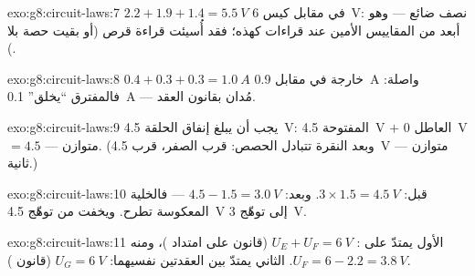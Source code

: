 \begin{solution}{exo:g8:circuit-laws:7}
$2.2 + 1.9 + 1.4 = \qty{5.5}{V}$ في مقابل كيس \qty{6}{V}: نصف
 ضائع --- وهو أبعد من  المقاييس الأمين عند قراءات
كهذه؛ فقد أُسيئت قراءة قرص (أو بقيت حصة بلا ).
\end{solution}

\begin{solution}{exo:g8:circuit-laws:8}
$0.4 + 0.3 + 0.3 = \qty{1.0}{A}$ خارجة في مقابل \qty{0.9}{A}
واصلة: فالمفترق ``يخلق'' \qty{0.1}{A} --- مُدان بقانون العقد.
\end{solution}

\begin{solution}{exo:g8:circuit-laws:9}
يجب أن يبلغ إنفاق الحلقة   \qty{4.5}{V}: 
المفتوحة \qty{4.5}{V} $+$  العاطل \qty{0}{V} $= 4.5$ ---
متوازن. (وبعد النقرة تتبادل الحصص:  قرب الصفر،
 قرب \qty{4.5}{V} --- متوازن ثانية.)
\end{solution}

\begin{solution}{exo:g8:circuit-laws:10}
قبل: $3 \times 1.5 = \qty{4.5}{V}$. وبعد: $4.5 - 1.5 =
\qty{3.0}{V}$ --- فالخلية المعكوسة تطرح. ويخفت  من
توهّج \qty{4.5}{V} إلى توهّج \qty{3}{V}.
\end{solution}

\begin{solution}{exo:g8:circuit-laws:11}
 الأول يمتدّ على : $U_E + U_F = \qty{6}{V}$
(قانون   على امتداد )، ومنه $U_F = 6 -
2.2 = \qty{3.8}{V}$.  الثاني يمتدّ بين العقدتين
نفسيهما: $U_G = \qty{6}{V}$ (قانون  ).
\end{solution}

